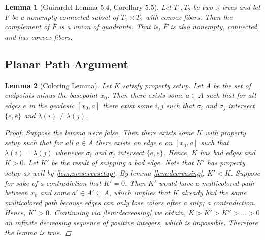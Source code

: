 \documentclass{article}
\theoremstyle{mystyle}
\newtheorem{lem}{Lemma}[section]
\theoremstyle{remark}
\begin{document}
\begin{lem}
	[Guirardel Lemma 5.4, Corollary 5.5]
 \label{lem:guirardel} 
	Let \(T_{1} , T_{2}\) be two \(\mathbb{R}\)-trees and let \(F\) be a nonempty connected subset of \(T_{1} \times T_{2}\) with convex fibers. Then the complement of \(\overline{F}\) is a union of quadrants. That is, \(\overline{F}\) is also nonempty, connected, and has convex fibers.
\end{lem}
\subsection{Planar Path Argument}

 \label{lem:ppa} 
\begin{lem}[Coloring Lemma]
    \label{lem:coloring} 
	Let \(K\) satisfy property setup. Let \(A\) be the set of endpoints minus the basepoint \(x_{ 0}\). Then there exists some \(a \in A\) such that for all edges \(e\) in the geodesic \([x_{0} , a]\) there exist some \(i, j\) such that \(\sigma_{i}\) and \(\sigma_{j}\) intersect \(\{e,\overline{e}\}\) and \(\lambda ( i ) \neq \lambda ( j )\).
    \begin{proof}
        Suppose the lemma were false. Then there exists some \(K\) with property setup such that for all \(a \in A\) there exists an edge \(e\) on \([x_{0} , a]\) such that \(\lambda (i)= \lambda (j)\) whenever \(\sigma_{i}\) and \(\sigma_{j}\) intersect \(\{e, \overline{e}\}\). Hence, \(K\) has bad edges and \(K > 0\). Let \(K'\) be the result of snipping a bad edge. Note that \(K'\) has property setup as well by \ref{lem:preservesetup}. By lemma \ref{lem:decreasing}, \(K'<K\). Suppose for sake of a contradiction that \(K' = 0\). Then \(K'\) would have a multicolored path between \(x_{0}\) and some \(a' \in A' \subseteq A\), which implies that \(K\) already had the same multicolored path because edges can only lose colors after a snip; a contradiction. Hence, \(K' > 0\). Continuing via \ref{lem:decreasing}  we obtain, \(K > K' > K'' > \ldots > 0\) an infinite decreasing sequence of positive integers, which is impossible. Therefore the lemma is true.
    \end{proof}
\end{lem}
\end{document}
